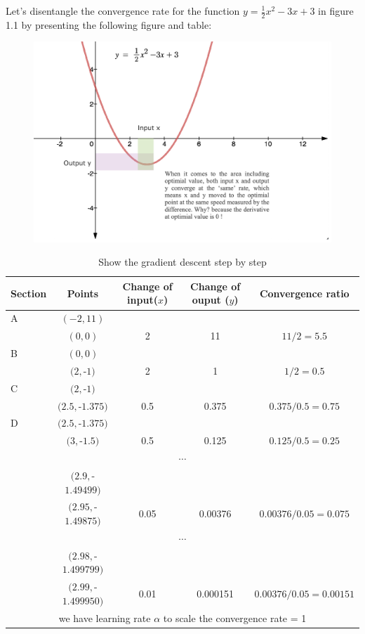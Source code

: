 \documentclass[12pt]{article}
\theoremstyle{definition}
\numberwithin{equation}{section}
\numberwithin{figure}{section}
\numberwithin{table}{section}
\begin{document}
Let's disentangle the convergence rate for the function $y= \frac{1}{2}x^2 - 3x + 3$ in figure 1.1 by presenting the following figure and table:
\begin{figure}[H]
  \centering
  \includegraphics[width = 0.7 \textwidth]{gradientEg2}
\end{figure}
{\footnotesize
\begin{table}[H]
  \centering
  \caption{Show the gradient descent step by step}
  \begin{tabular}{lcccc}
    \hline
    \hline
    Section & Points & Change of input($x$) & Change of ouput ($y$) & Convergence ratio  \\
    \hline
    A & $(-2, 11)$ & \\
    & $(0,0)$ & 2 & 11 & $11/2 = 5.5$ \\
    \hline
    B & $(0,0)$ & \\
    & $(2, $-$1)$ & 2 & 1 & $1/2 = 0.5$ \\
      \hline
    C & $(2, $-$1)$ &  \\
    & $(2.5, $-$1.375)$ & 0.5 & 0.375 & $0.375/0.5 = 0.75$ \\
    \hline
    D & $(2.5, $-$1.375)$ & \\
    & $(3, $-$1.5)$ & 0.5 & 0.125 & $0.125/0.5 = 0.25$ \\
    \hline
    \multicolumn{5}{c}{$\cdots$} \\
    \hline
    & $(2.9, $-$1.49499)$& \\
    & $(2.95, $-$1.49875)$ & 0.05 & 0.00376 & $0.00376 /0.05 = 0.075$  \\
    \hline
    \multicolumn{5}{c}{$\cdots$} \\
    \hline
    & $(2.98, $-$1.499799)$& \\
    & $(2.99, $-$1.499950)$ & 0.01 & 0.000151 & $0.00376 /0.05 = 0.00151$  \\
    \hline
    \multicolumn{5}{c}{we have learning rate $\alpha$ to scale the convergence rate = 1} \\
    \hline
  \end{tabular}
\end{table}
}
\end{document}
